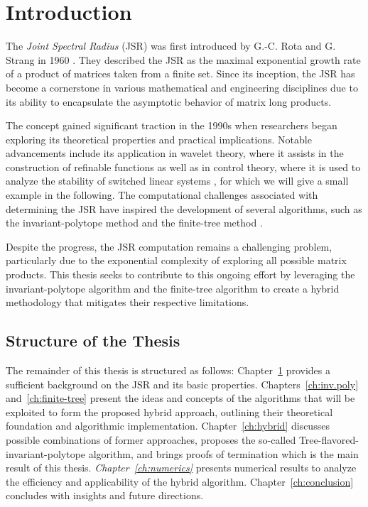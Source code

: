
\chapter{Introduction}
\label{ch:introduction} %

The \textit{Joint Spectral Radius} (JSR) was first introduced by G.-C. Rota and G. Strang in 1960 \citep{rotaNoteJointSpectral1960}. They described the JSR as the maximal exponential growth rate of a product of matrices taken from a finite set. Since its inception, the JSR has become a cornerstone in various mathematical and engineering disciplines due to its ability to encapsulate the asymptotic behavior of matrix long products. 

The concept gained significant traction in the 1990s when researchers began exploring its theoretical properties and practical implications. Notable advancements include its application in wavelet theory, where it assists in the construction of refinable functions \citep{daubechies1992sets} as well as in control theory, where it is used to analyze the stability of switched linear systems \citep{blondelSurveyComputationalComplexity2000}, for which we will give a small example in the following. The computational challenges associated with determining the JSR have inspired the development of several algorithms, such as the invariant-polytope method \citep{guglielmiExactComputationJoint2013} and the finite-tree method \citep{mollerTreebasedApproachJoint2014}.

Despite the progress, the JSR computation remains a challenging problem, particularly due to the exponential complexity of exploring all possible matrix products. This thesis seeks to contribute to this ongoing effort by leveraging the invariant-polytope algorithm and the finite-tree algorithm to create a hybrid methodology that mitigates their respective limitations.

\section*{Structure of the Thesis}
The remainder of this thesis is structured as follows: Chapter~\ref{ch:introduction} provides a sufficient background on the JSR and its basic properties. Chapters~\ref{ch:inv.poly} and~\ref{ch:finite-tree} present the ideas and concepts of the algorithms that will be exploited to form the proposed hybrid approach, outlining their theoretical foundation and algorithmic implementation. Chapter~\ref{ch:hybrid} discusses possible combinations of former approaches, proposes the so-called Tree-flavored-invariant-polytope algorithm, and brings proofs of termination which is the main result of this thesis. \emph{Chapter~\ref{ch:numerics}} presents numerical results to analyze the efficiency and applicability of the hybrid algorithm. Chapter~\ref{ch:conclusion} concludes with insights and future directions.

